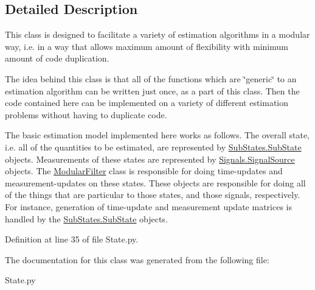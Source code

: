 \subsection{Detailed Description}
This class is designed to facilitate a variety of estimation algorithms in a modular way, i.\+e. in a way that allows maximum amount of flexibility with minimum amount of code duplication.

The idea behind this class is that all of the functions which are \char`\"{}generic\char`\"{} to an estimation algorithm can be written just once, as a part of this class. Then the code contained here can be implemented on a variety of different estimation problems without having to duplicate code.

The basic estimation model implemented here works as follows. The overall state, i.\+e. all of the quantities to be estimated, are represented by \hyperlink{classSubStates_1_1SubState}{Sub\+States.\+Sub\+State} objects. Measurements of these states are represented by \hyperlink{classSignals_1_1SignalSource}{Signals.\+Signal\+Source} objects. The \hyperlink{classState_1_1ModularFilter}{Modular\+Filter} class is responsible for doing time-\/updates and measurement-\/updates on these states. These objects are responsible for doing all of the things that are particular to those states, and those signals, respectively. For instance, generation of time-\/update and measurement update matrices is handled by the \hyperlink{classSubStates_1_1SubState}{Sub\+States.\+Sub\+State} objects. 

Definition at line 35 of file State.\+py.



The documentation for this class was generated from the following file\+:\begin{DoxyCompactItemize}
\item 
State.\+py\end{DoxyCompactItemize}
